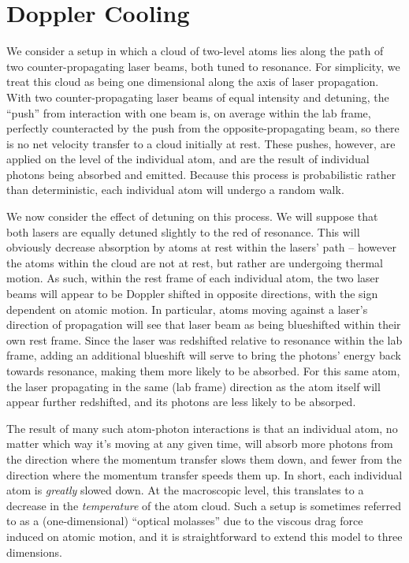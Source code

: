 \section{Doppler Cooling}
\label{sec:dopplercooling}
We consider a setup in which a cloud of two-level atoms lies along the path of two counter-propagating laser beams, both tuned to
resonance.  For simplicity, we treat this cloud as being one dimensional along the axis of laser propagation.  
With two counter-propagating laser beams of equal intensity and detuning,
the ``push'' from interaction with one beam is, on average within the lab frame, perfectly counteracted by the push from the opposite-propagating beam, so there is no net velocity transfer to a cloud initially at rest.  These pushes, however, are applied on the level of the individual atom, and are the result of individual photons being absorbed and emitted.  Because this process is probabilistic rather than deterministic, each individual atom will undergo a random walk.  

We now consider the effect of detuning on this process.  We will suppose that both lasers are equally detuned slightly to the red of resonance.  This will obviously decrease absorption by atoms at rest within the lasers' path -- however the atoms within the cloud are not at rest, but rather are undergoing thermal motion.  As such, within the rest frame of each individual atom, the two laser beams will appear to be Doppler shifted in opposite directions, with the sign dependent on atomic motion.  In particular, atoms moving against a laser's direction of propagation will see that laser beam as being blueshifted within their own rest frame.  Since the laser was redshifted relative to resonance within the lab frame, adding an additional blueshift will serve to bring the photons' energy back towards resonance, making them more likely to be absorbed.  For this same atom, the laser propagating in the same (lab frame) direction as the atom itself will appear further redshifted, and its photons are less likely to be absorped.  

The result of many such atom-photon interactions is that an individual atom, no matter which way it's moving at any given time, will absorb more photons from the direction where the momentum transfer slows them down, and fewer from the direction where the momentum transfer speeds them up.  In short, each individual atom is \emph{greatly} slowed down.  At the macroscopic level, this translates to a decrease in the \emph{temperature} of the atom cloud.  Such a setup is sometimes referred to as a (one-dimensional) ``optical molasses'' due to the viscous drag force induced on atomic motion, and it is straightforward to extend this model to three dimensions.

